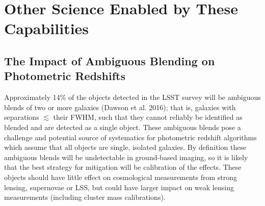 \section{Other Science Enabled by These Capabilities}


%
%







\subsection{The Impact of Ambiguous Blending on Photometric Redshifts}

Approximately 14\% of the objects detected in the LSST survey will be ambiguous blends of two or more galaxies (Dawson et al. 2016); that is, galaxies with separations $\lesssim$ their FWHM, such that they cannot reliably be identified as blended and are detected as a single object. These ambiguous blends pose a challenge and potential source of systematics for photometric redshift algorithms which assume that all objects are single, isolated galaxies. By definition these ambiguous blends will be undetectable in ground-based imaging, so it is likely that the best strategy for mitigation will be calibration of the effects.  These objects should have little effect on cosmological measurements from strong lensing, supernovae or LSS, but could have larger impact on weak lensing measurements (including cluster mass calibrations).

